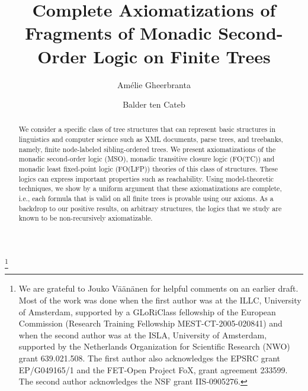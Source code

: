 \documentclass{LMCS}
\newcommand{\xml}{\textsf{XML}\xspace}
\newcommand{\mso}{\textsf{MSO}\xspace}
\newcommand{\fotc}{\textsf{FO(TC)}\xspace}
\newcommand{\folfp}{\textsf{FO(LFP)}\xspace}
\begin{document}
\title[Complete Axiomatizations of Fragments of MSO on Finite Trees]{Complete Axiomatizations of Fragments of Monadic Second-Order Logic on Finite Trees}

\thanks{{}We are grateful to Jouko V\"a\"an\"anen for helpful comments on an earlier draft. Most of the work was done when the first author was at the ILLC, University of Amsterdam, supported by a GLoRiClass fellowship of the European Commission (Research Training Fellowship MEST-CT-2005-020841) and when the second author was at the ISLA, University of Amsterdam, supported by the Netherlands Organization
for Scientific Research (NWO) grant 639.021.508. The first author also
acknowledges the EPSRC grant EP/G049165/1 and the FET-Open Project FoX, grant agreement
233599. The second author
acknowledges the NSF grant IIS-0905276.}

\author[A.~Gheerbrant]{Am\'{e}lie Gheerbrant\rsuper a}
\address{{\lsuper a}School of Informatics, University of Edinburgh}

\author[B.~ten Cate]{Balder ten Cate\rsuper b}
\address{{\lsuper b}Department of Computer Science, University of
  California, Santa Cruz}

\begin{abstract}
We consider a specific class of tree structures that can 
represent basic structures in linguistics and computer science such as \xml
documents, parse trees, and treebanks, namely, finite node-labeled sibling-ordered
trees. We present axiomatizations of the monadic second-order logic (\mso),
monadic transitive closure logic (\fotc) and monadic least fixed-point logic (\folfp) theories of this class of structures. 
These logics can express important properties such as reachability. 
Using model-theoretic techniques, we show by a uniform argument that these axiomatizations are
complete, i.e., each formula that is valid on all finite trees is provable using our axioms.
As a backdrop to our positive results, on arbitrary structures, the logics that we study are known to be
non-recursively axiomatizable.
\end{abstract}


\maketitle
\end{document}
